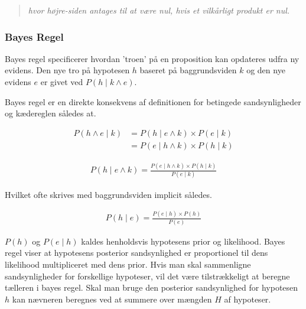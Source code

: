 \begin{quotation}
	\textit{hvor højre-siden antages til at være nul, hvis et vilkårligt produkt er nul.}
\end{quotation}

\cite[s. 227]{ArtificialIntelligence}

\subsubsection{Bayes Regel}

Bayes regel specificerer hvordan 'troen' på en proposition kan opdateres udfra ny evidens.
Den nye tro på hypotesen $h$ baseret på baggrundsviden $k$ og den nye evidens $e$ er givet ved $P(h \mid k \wedge e)$.

Bayes regel er en direkte konsekvens af definitionen for betingede sandsynligheder og kædereglen således at. 

\begin{equation}
\begin{split}
P(h \wedge e \mid k) &= P(h \mid e \wedge k) \times P(e \mid k) \\
&= P(e \mid h \wedge k) \times P(h \mid k)
\end{split}
\end{equation}

\begin{equation}
\begin{split}
P(h \mid e \wedge k) = \frac{P(e \mid h \wedge k) \times P(h \mid k)}{P(e \mid k)}
\end{split}
\end{equation}

Hvilket ofte skrives med baggrundsviden implicit således.

\begin{equation}
\begin{split}
P(h \mid e) = \frac{P(e \mid h) \times P(h)}{P(e)}
\end{split}
\end{equation}

$P(h)$ og $P(e \mid h)$ kaldes henholdsvis hypotesens prior og likelihood.
Bayes regel viser at hypotesens posterior sandsynlighed er proportionel til dens likelihood multipliceret med dens prior.
Hvis man skal sammenligne sandsynligheder for forskellige hypoteser, vil det være tilstrækkeligt at beregne tælleren i bayes regel.
Skal man bruge den posterior sandsynlighed for hypotesen $h$ kan nævneren beregnes ved at summere over mængden $H$ af hypoteser.

